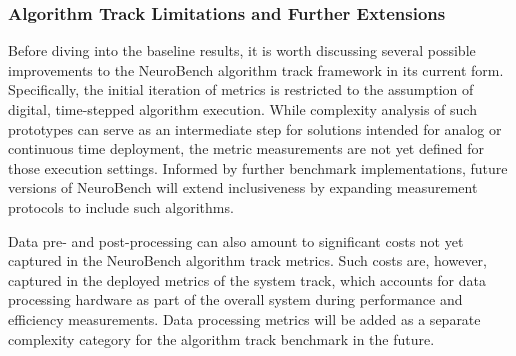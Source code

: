 \subsubsection*{Algorithm Track Limitations and Further Extensions}

Before diving into the baseline results, it is worth discussing several possible improvements to the NeuroBench algorithm track framework in its current form. Specifically, the initial iteration of metrics is restricted to the assumption of digital, time-stepped algorithm execution. While complexity analysis of such prototypes can serve as an intermediate step for solutions intended for analog or continuous time deployment, the metric measurements are not yet defined for those execution settings. Informed by further benchmark implementations, future versions of NeuroBench will extend inclusiveness by expanding measurement protocols to include such algorithms.



Data pre- and post-processing can also amount to significant costs not yet captured in the NeuroBench algorithm track metrics. Such costs are, however, captured in the deployed metrics of the system track, which accounts for data processing hardware as part of the overall system during performance and efficiency measurements. Data processing metrics will be added as a separate complexity category for the algorithm track benchmark in the future.


